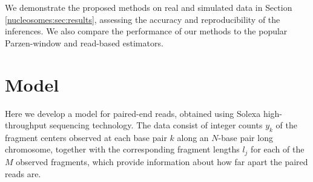 We demonstrate the proposed methods on real and simulated data in Section \ref{nucleosomes:sec:results}, assessing the accuracy and reproducibility of the inferences.
We also compare the performance of our methods to the popular Parzen-window and read-based estimators.


\section{Model}
\label{nucleosomes:sec:model}

Here we develop a model for paired-end reads, obtained using Solexa high-throughput sequencing technology. 
%
The data consist of integer counts $y_k$ of the fragment centers observed at each base pair $k$ along an $N$-base pair long chromosome, together with the corresponding fragment lengths $l_j$ for each of the $M$ observed fragments, which provide information about how far apart the paired reads are. 

